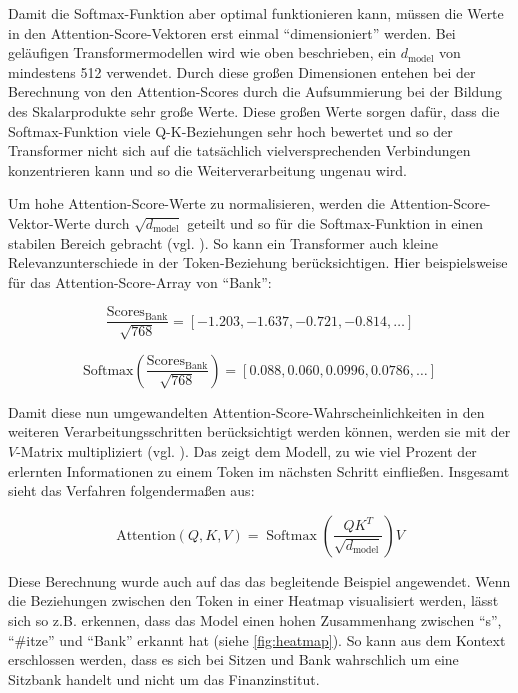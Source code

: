 Damit die Softmax-Funktion aber optimal funktionieren kann, müssen die Werte in den Attention-Score-Vektoren erst einmal \enquote{dimensioniert} werden.
Bei geläufigen Transformermodellen wird wie oben beschrieben, ein \( d_{\text{model}} \) von mindestens 512 verwendet.
Durch diese großen Dimensionen entehen bei der Berechnung von den Attention-Scores durch die Aufsummierung bei der Bildung des Skalarprodukte sehr große Werte.
Diese großen Werte sorgen dafür, dass die Softmax-Funktion viele Q-K-Beziehungen sehr hoch bewertet und so der Transformer nicht sich auf die tatsächlich vielversprechenden Verbindungen konzentrieren kann und so die Weiterverarbeitung ungenau wird.

Um hohe Attention-Score-Werte zu normalisieren, werden die Attention-Score-Vektor-Werte durch \( \sqrt{d_{\text{model}}} \) geteilt und so für die Softmax-Funktion in einen stabilen Bereich gebracht (vgl. \cite[S. 4]{attention}).
So kann ein Transformer auch kleine Relevanzunterschiede in der Token-Beziehung berücksichtigen.
Hier beispielsweise für das Attention-Score-Array von \enquote{Bank}:

\[
\frac{\text{Scores}_{\text{Bank}}}{\sqrt{768}} = [-1.203, -1.637, -0.721, -0.814, \dots]
\]

\[
\text{Softmax}\left(\frac{\text{Scores}_{\text{Bank}}}{\sqrt{768}}\right) = [0.088, 0.060, 0.0996, 0.0786, \dots]
\]

Damit diese nun umgewandelten Attention-Score-Wahrscheinlichkeiten in den weiteren Verarbeitungsschritten berücksichtigt werden können, werden sie mit der \( V \)-Matrix multipliziert (vgl. \cite[S. 4]{attention}). 
Das zeigt dem Modell, zu wie viel Prozent der erlernten Informationen zu einem Token im nächsten Schritt einfließen.
Insgesamt sieht das Verfahren folgendermaßen aus:

\[
\text{Attention}(Q, K, V) = \operatorname{Softmax}\left(\frac{QK^T}{\sqrt{d_{\text{model}}}}\right) V
\]

Diese Berechnung wurde auch auf das das begleitende Beispiel angewendet.
Wenn die Beziehungen zwischen den Token in einer Heatmap visualisiert werden, lässt sich so z.B. erkennen, dass das Model einen hohen Zusammenhang zwischen \enquote{s}, \enquote{#itze} und \enquote{Bank} erkannt hat (siehe \ref{fig:heatmap}). 
So kann aus dem Kontext erschlossen werden, dass es sich bei Sitzen und Bank wahrschlich um eine Sitzbank handelt und nicht um das Finanzinstitut.

